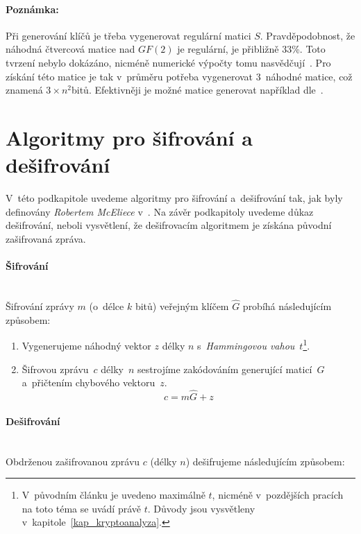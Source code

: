 \documentclass[thesis=M,czech,hidelinks]{FITthesis}[2012/06/26]
\newcommand{\0}{{\textcolor[gray]{0.75}{0}}}
\begin{document}
\paragraph{Poznámka:} Při generování klíčů je třeba vygenerovat regulární matici
$S$. Pravděpodobnost, že náhodná čtvercová matice nad $GF(2)$ je regulární, je
přibližně $33$\;\%.  Toto tvrzení nebylo dokázáno, nicméně numerické výpočty
tomu nasvědčují~\cite{Heyse}. Pro získání této matice je tak v~průměru potřeba
vygenerovat $3$~náhodné matice, což znamená $3\times n^2$\;bitů. Efektivněji je
možné matice generovat například dle~\cite{Randall}.



\section{Algoritmy pro šifrování a dešifrování}\label{kap_mceliece_algoritmy}

V~této podkapitole uvedeme algoritmy pro šifrování a~dešifrování tak, jak
byly definovány \emph{Robertem McEliece} v~\cite{McEliece}. Na závěr podkapitoly
uvedeme důkaz dešifrování, neboli vysvětlení, že dešifrovacím algoritmem je
získána původní zašifrovaná zpráva.


\paragraph{Šifrování} \hfil \\
Šifrování zprávy $m$ (o~délce $k$ bitů) veřejným klíčem $\hat{G}$ probíhá
následujícím způsobem:

\begin{enumerate}
    \item Vygenerujeme náhodný vektor $z$ délky $n$ s~\emph{Hammingovou
        vahou}~$t$\footnote{
            V~původním článku je uvedeno maximálně $t$, nicméně v~pozdějších
            pracích na toto téma se uvádí právě $t$. Důvody jsou vysvětleny
            v~kapitole~\ref{kap_kryptoanalyza}.
        }.
    \item Šifrovou zprávu~$c$ délky~$n$ sestrojíme zakódováním generující
        maticí~$\hat{G}$ a~přičtením chybového vektoru~$z$.
        $$ c = m \hat{G} + z $$
\end{enumerate}


\paragraph{Dešifrování} \hfil \\
Obdrženou zašifrovanou zprávu $c$ (délky $n$) dešifrujeme následujícím způsobem:
\end{document}
